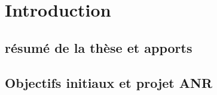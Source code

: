 %

\chapter{Introduction}
\label{sec:introduction}


\section{résumé de la thèse et apports}
\label{sec:introduction:résumé}
\section{Objectifs initiaux et projet ANR}
\label{sec:introduction:objectifs}